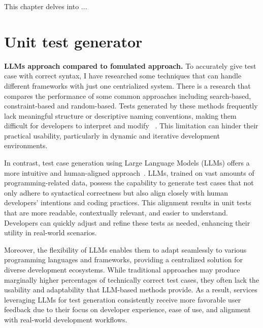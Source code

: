 This chapter delves into ...

\section{Unit test generator}

\hspace{0.5cm} \textbf{LLMs approach compared to fomulated approach.} To accurately give test case with correct syntax, I have researched some techniques that can handle different frameworks with just one centrialized system. There is a research that compares the performance of some common approaches including search-based, constraint-based and random-based. Tests generated by these methods frequently lack meaningful structure or descriptive naming conventions, making them difficult for developers to interpret and modify ~\cite{UnitTest}. This limitation can hinder their practical usability, particularly in dynamic and iterative development environments.

\hspace{0.5cm} In contrast, test case generation using Large Language Models (LLMs) offers a more intuitive and human-aligned approach~\cite{UnitTest}. LLMs, trained on vast amounts of programming-related data, possess the capability to generate test cases that not only adhere to syntactical correctness but also align closely with human developers' intentions and coding practices. This alignment results in unit tests that are more readable, contextually relevant, and easier to understand. Developers can quickly adjust and refine these tests as needed, enhancing their utility in real-world scenarios.

\hspace{0.5cm} Moreover, the flexibility of LLMs enables them to adapt seamlessly to various programming languages and frameworks, providing a centralized solution for diverse development ecosystems. While traditional approaches may produce marginally higher percentages of technically correct test cases, they often lack the usability and adaptability that LLM-based methods provide. As a result, services leveraging LLMs for test generation consistently receive more favorable user feedback due to their focus on developer experience, ease of use, and alignment with real-world development workflows.

